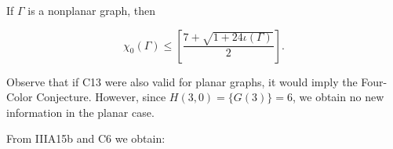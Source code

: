 If $\Gamma$ is a nonplanar graph, then

$$\chi_0(\Gamma) \leq \left[ \frac{7 + \sqrt{1 + 24\iota(\Gamma)}}{2} \right].$$

Observe that if C13 were also valid for planar graphs, it would imply the Four-Color Conjecture. However, since $H(3, 0) = \{G(3)\} = 6$, we obtain no new information in the planar case.

From IIIA15b and C6 we obtain:
